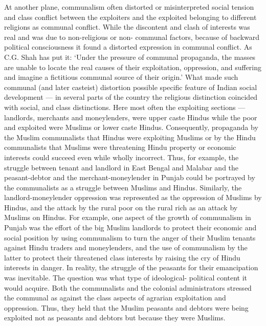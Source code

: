 At another plane, communalism often distorted or misinterpreted social tension and class conflict between the exploiters and the exploited belonging to different religions as communal conflict. While the discontent and clash of interests was real and was due to non-religious or non- communal factors, because of backward political consciousness it found a distorted expression in communal conflict. As C.G. Shah has put it: `Under the pressure of communal propaganda, the masses are unable to locate the real causes of their exploitation, oppression, and suffering and imagine a fictitious communal source of their origin.' What made such communal (and later casteist) distortion possible specific feature of Indian social development --- in several parts of the country the religious distinction coincided with social, and class distinctions. Here most often the exploiting sections --- landlords, merchants and moneylenders, were upper caste Hindus while the poor and exploited were Muslims or lower caste Hindus. Consequently, propaganda by the Muslim communalists that Hindus were exploiting Muslims or by the Hindu communalists that Muslims were threatening Hindu property or economic interests could succeed even while wholly incorrect. Thus, for example, the struggle between tenant and landlord in East Bengal and Malabar and the peasant-debtor and the merchant-moneylender in Punjab could be portrayed by the communalists as a struggle between Muslims and Hindus. Similarly, the landlord-moneylender oppression was represented as the oppression of Muslims by Hindus, and the attack by the rural poor on the rural rich as an attack by Muslims on Hindus. For example, one aspect of the growth of communalism in Punjab was the effort of the big Muslim landlords to protect their economic and social position by using communalism to turn the anger of their Muslim tenants against Hindu traders and moneylenders, and the use of communalism by the latter to protect their threatened class interests by raising the cry of Hindu interests in danger. In reality, the struggle of the peasants for their emancipation was inevitable. The question was what type of ideological- political content it would acquire. Both the communalists and the colonial administrators stressed the communal as against the class aspects of agrarian exploitation and oppression. Thus, they held that the Muslim peasants and debtors were being exploited not as peasants and debtors but because they were Muslims. 

